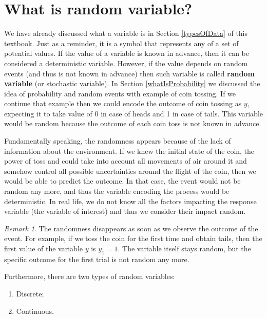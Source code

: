 \documentclass[
]{book}
\providecommand{\tightlist}{%
  \setlength{\itemsep}{0pt}\setlength{\parskip}{0pt}}
\theoremstyle{definition}
\theoremstyle{definition}
\theoremstyle{definition}
\theoremstyle{definition}
\theoremstyle{remark}
\newtheorem*{remark}{Remark}
\begin{document}
\section{What is random variable?}\label{whatIsRandomVariable}

We have already discussed what a variable is in Section \ref{typesOfData} of this textbook. Just as a reminder, it is a symbol that represents any of a set of potential values. If the value of a variable is known in advance, then it can be considered a deterministic variable. However, if the value depends on random events (and thus is not known in advance) then such variable is called \textbf{random variable} (or stochastic variable). In Section \ref{whatIsProbability} we discussed the idea of probability and random events with example of coin tossing. If we continue that example then we could encode the outcome of coin tossing as \(y\), expecting it to take value of 0 in case of heads and 1 in case of tails. This variable would be random because the outcome of each coin toss is not known in advance.

Fundamentally speaking, the randomness appears because of the lack of information about the environment. If we knew the initial state of the coin, the power of toss and could take into account all movements of air around it and somehow control all possible uncertainties around the flight of the coin, then we would be able to predict the outcome. In that case, the event would not be random any more, and thus the variable encoding the process would be deterministic. In real life, we do not know all the factors impacting the response variable (the variable of interest) and thus we consider their impact random.

\begin{remark}
The randomness disappears as soon as we observe the outcome of the event. For example, if we toss the coin for the first time and obtain tails, then the first value of the variable \(y\) is \(y_1=1\). The variable itself stays random, but the specific outcome for the first trial is not random any more.
\end{remark}

Furthermore, there are two types of random variables:

\begin{enumerate}
\def\labelenumi{\arabic{enumi}.}
\tightlist
\item
  Discrete;
\item
  Continuous.
\end{enumerate}
\end{document}
